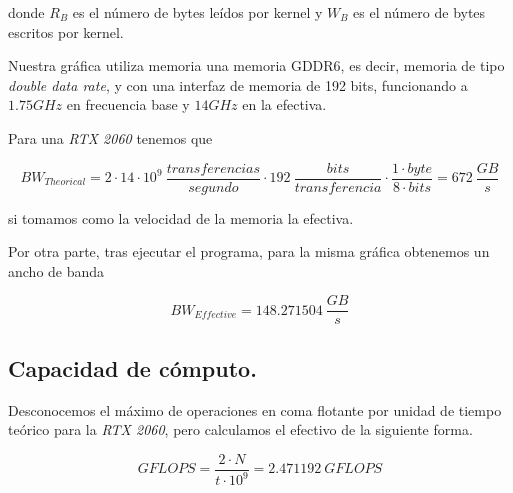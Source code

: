 donde $R_{B}$ es el número de bytes leídos por kernel y $W_{B}$ es el número de bytes
escritos por kernel.

\pagebreak

Nuestra gráfica utiliza memoria una memoria GDDR6, es decir, memoria de tipo \textit{double data rate},
y con una interfaz de memoria de 192 bits, funcionando a $1.75GHz$ en frecuencia base y $14GHz$ en la efectiva.

Para una \textit{RTX 2060} tenemos que

$$ BW_{Theorical} = 2 \cdot 14 \cdot 10^{9} \ \frac{transferencias}{segundo} \cdot 192 \ \frac{bits}{transferencia} \cdot \frac{1 \cdot byte}{ 8 \cdot bits} = 672 \ \frac{GB}{s} $$

si tomamos como la velocidad de la memoria la efectiva.

Por otra parte, tras ejecutar el programa, para la misma gráfica obtenemos un ancho de banda

$$ BW_{Effective} = 148.271504 \ \frac{GB}{s} $$

\subsection{Capacidad de cómputo.}

Desconocemos el máximo de operaciones en coma flotante por unidad de tiempo teórico para la \textit{RTX 2060}, pero calculamos el efectivo de la siguiente forma.

$$ GFLOPS = \frac{2 \cdot N}{t \cdot 10^{9}} = 2.471192 \ GFLOPS $$

